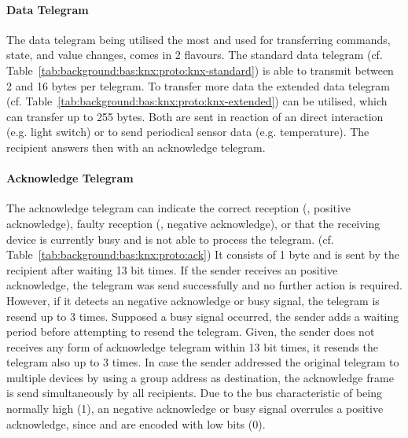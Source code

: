 

\paragraph{Data Telegram}
\label{sec:background:bas:knx:proto:data}

The data telegram being utilised the most and used for transferring commands, state, and value changes, comes in 2 flavours.
The standard data telegram (cf. Table~\ref{tab:background:bas:knx:proto:knx-standard}) is able to transmit between 2 and 16 bytes per telegram. To transfer more data the extended data telegram (cf. Table~\ref{tab:background:bas:knx:proto:knx-extended}) can be utilised, which can transfer up to 255 bytes.
Both are sent in reaction of an direct interaction (e.g. light switch) or to send periodical sensor data (e.g. temperature). \parencite{Merz2009}
The recipient answers then with an acknowledge telegram. \parencite{Merz2009,Sokollik2017}





\paragraph{Acknowledge Telegram}
\label{sec:background:bas:knx:proto:ack}

The acknowledge telegram can indicate the correct reception (, positive acknowledge), faulty reception (, negative acknowledge), or that the receiving device is currently busy and is not able to process the telegram. (cf. Table~\ref{tab:background:bas:knx:proto:ack})
It consists of 1 byte and is sent by the recipient after waiting 13 bit times.
If the sender receives an positive acknowledge, the telegram was send successfully and no further action is required. However, if it detects an negative acknowledge or busy signal, the telegram is resend up to 3 times.
Supposed a busy signal occurred, the sender adds a waiting period before attempting to resend the telegram.
Given, the sender does not receives any form of acknowledge telegram within 13 bit times, it resends the telegram also up to 3 times.
In case the sender addressed the original telegram to multiple devices by using a group address as destination, the acknowledge frame is send simultaneously by all recipients. Due to the bus characteristic of being normally high (1), an negative acknowledge or busy signal overrules a positive acknowledge, since  and  are encoded with low bits (0). \parencite{Merz2009,Sokollik2017}

